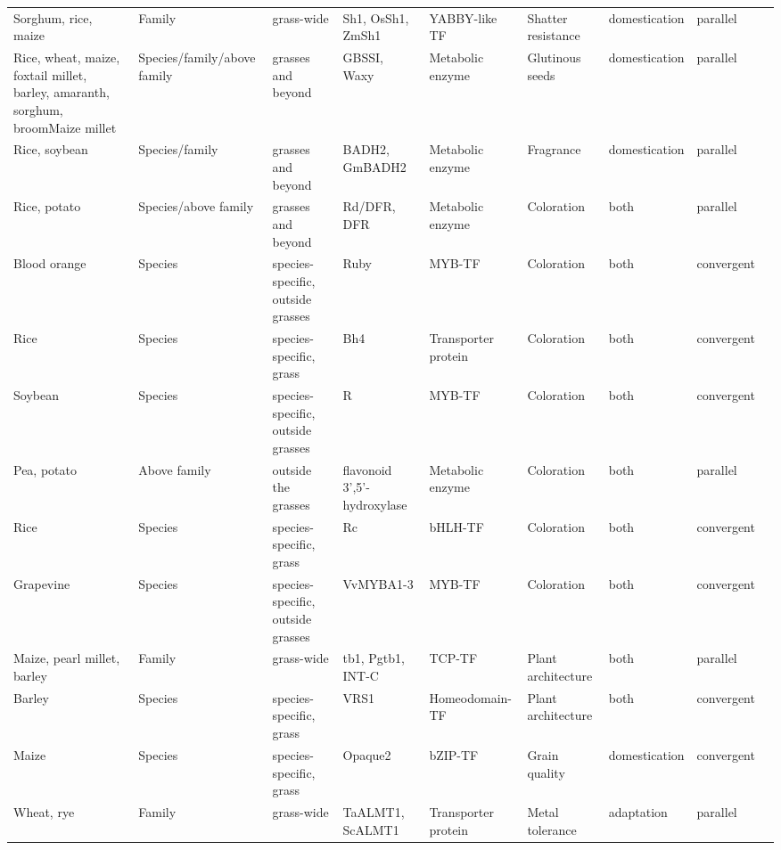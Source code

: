\documentclass[12pt]{article}
\begin{document}
\begin{table}
\begin{center}
\begin{tabular}{G{3.5cm}G{2.5cm}C{3.10cm}C{3.5cm}C{1.95cm}G{2.0cm}G{1.8cm}G{1.5cm}G{1.5cm}}
Sorghum, rice, maize & Family & grass-wide & Sh1, OsSh1, ZmSh1 & YABBY-like TF & Shatter resistance & domestication & parallel & \citep{Lin2012}\\
Rice, wheat, maize, foxtail millet, barley, amaranth, sorghum, broomMaize millet & Species/family/above family & grasses and beyond & GBSSI, Waxy & Metabolic enzyme & Glutinous seeds & domestication & parallel & \cite{Jeon2010, Fan2008, Kawahigashi2013, Kawase2005, Hunt2012, Park2011}\\
Rice, soybean & Species/family & grasses and beyond & BADH2, GmBADH2 & Metabolic enzyme & Fragrance & domestication & parallel & \citep{Kovach2009, Juwattanasomran2010}\\
Rice, potato & Species/above family & grasses and beyond & Rd/DFR, DFR & Metabolic enzyme & Coloration & both & parallel & \citep{Furukawa2006, Zhang2009}\\
Blood orange & Species & species-specific, outside grasses & Ruby & MYB-TF & Coloration & both & convergent & \citep{Butelli2012}\\
Rice & Species & species-specific, grass & Bh4 & Transporter protein & Coloration & both & convergent & \citep{Zhu2011}\\
Soybean & Species & species-specific, outside grasses & R & MYB-TF & Coloration & both & convergent & \citep{Gillman2011}\\
Pea, potato & Above family & outside the grasses & flavonoid 3',5'-hydroxylase & Metabolic enzyme & Coloration & both & parallel & \citep{Martin2013}\\
Rice & Species & species-specific, grass & Rc & bHLH-TF & Coloration & both & convergent & \citep{Martin2013}\\
Grapevine & Species & species-specific, outside grasses & VvMYBA1-3 & MYB-TF & Coloration & both & convergent & \citep{Martin2013}\\
Maize, pearl millet, barley & Family & grass-wide & tb1, Pgtb1, INT-C & TCP-TF & Plant architecture & both & parallel & \citep{Studer2011, Remigereau2011, Ramsay2011}\\
Barley & Species & species-specific, grass & VRS1 & Homeodomain-TF & Plant architecture & both & convergent & \citep{Martin2013}\\
Maize & Species & species-specific, grass & Opaque2 & bZIP-TF & Grain quality & domestication & convergent & \citep{Martin2013}\\
Wheat, rye & Family & grass-wide & TaALMT1, ScALMT1 & Transporter protein & Metal tolerance & adaptation & parallel & \citep{Martin2013}\\

\end{tabular}
\end{center}
\end{table}
\end{document}

